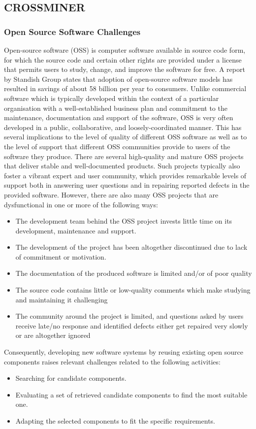 \subsection{CROSSMINER}

\subsubsection{Open Source Software Challenges}
Open-source software (OSS) is computer software available in source code form, for which the source code and certain other rights are provided under a license that permits users to study, change, and improve the software for free. A report by Standish Group states that adoption of open-source software models has resulted in savings of about 58 billion per year to consumers. Unlike commercial software which is typically developed within the context of a particular organisation with a well-established business plan and commitment to the maintenance, documentation and support of the software, OSS is very often developed in a public, collaborative, and loosely-coordinated manner. This has several implications to the level of quality of different OSS software as well as to the level of support that different OSS communities provide to users of the software they produce.
There are several high-quality and mature OSS projects that deliver stable and well-documented products. Such projects typically also foster a vibrant expert and user community, which provides remarkable levels of support both in answering user questions and in repairing reported defects in the provided software. However, there are also many OSS projects that are dysfunctional in one or more of the following ways:
\begin{itemize}
	\item The development team behind the OSS project invests little time on its development, maintenance and support.
	\item The development of the project has been altogether discontinued due to lack of commitment or motivation.
	\item The documentation of the produced software is limited and/or of poor quality
	\item The source code contains little or low-quality comments which make studying and maintaining it challenging
	\item The community around the project is limited, and questions asked by users receive late/no response and identified defects either get repaired very slowly or are altogether ignored
\end{itemize}
Consequently, developing new software systems by reusing existing open source components raises relevant challenges related to the following activities:
\begin{itemize}
	\item Searching for candidate components.
	\item Evaluating a set of retrieved candidate components to find the most suitable one.
	\item Adapting the selected components to fit the specific requirements.
\end{itemize}


